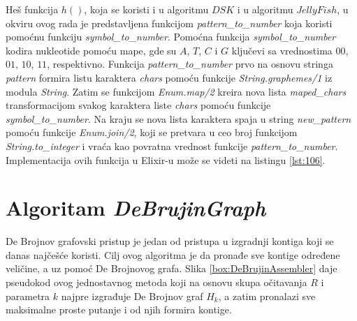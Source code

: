 \documentclass[12pt,oneside]{memoir}
\begin{document}
Heš funkcija $h()$, koja se koristi i u algoritmu $DSK$ i u algoritmu $JellyFish$, u okviru ovog rada je predstavljena funkcijom \textit{pattern\_to\_number} koja koristi pomoćnu funkciju \textit{symbol\_to\_number}. Pomoćna funkcija \textit{symbol\_to\_number} kodira nukleotide pomoću mape, gde su $A$, $T$, $C$ i $G$ ključevi sa vrednostima $00$, $01$, $10$, $11$, respektivno. Funkcija \textit{pattern\_to\_number} prvo na osnovu stringa \textit{pattern} formira listu karaktera \textit{chars} pomoću funkcije \textit{String.graphemes/1} iz modula \textit{String}. Zatim se funkcijom \textit{Enum.map/2} kreira nova lista \textit{maped\_chars} transformacijom svakog karaktera liste \textit{chars} pomoću funkcije \textit{symbol\_to\_number}. Na kraju se nova lista karaktera spaja u string \textit{new\_pattern} pomoću funkcije \textit{Enum.join/2}, koji se pretvara u ceo broj funkcijom \textit{String.to\_integer} i vraća kao povratna vrednost funkcije \textit{pattern\_to\_number}. Implementacija ovih funkcija u Elixir-u može se videti na listingu \ref{lst:106}.



\section{Algoritam \textit{DeBrujinGraph}}
\label{odeljak:ImplementacijaDB}

De Brojnov grafovski pristup je jedan od pristupa u izgradnji kontiga koji se danas najčešće koristi. Cilj ovog algoritma je da pronađe sve kontige određene veličine, a uz pomoć De Brojnovog grafa. Slika \ref{box:DeBrujinAssembler} daje pseudokod ovog jednostavnog metoda koji na osnovu skupa očitavanja $R$ i parametra $k$ najpre izgrađuje De Brojnov graf $H_k$, a zatim pronalazi sve maksimalne proste putanje i od njih formira kontige.

\begin{comment}

\begin{figure}[!ht]
\centering
\texttt{[image: Figura5\_17.PNG]}
\caption{Jednostavan De Brojnov grafovski asembler \cite{WingKinSung}}
\label{fig:11}
\end{figure}

\end{comment}
\end{document}
